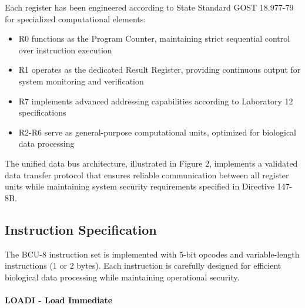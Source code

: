 \documentclass[12pt]{article}
\begin{document}
Each register has been engineered according to State Standard GOST 18.977-79 for specialized computational elements:
\begin{itemize}
    \item R0 functions as the Program Counter, maintaining strict sequential control over instruction execution
    \item R1 operates as the dedicated Result Register, providing continuous output for system monitoring and verification
    \item R7 implements advanced addressing capabilities according to Laboratory 12 specifications
    \item R2-R6 serve as general-purpose computational units, optimized for biological data processing
\end{itemize}

The unified data bus architecture, illustrated in Figure 2, implements a validated data transfer protocol that ensures reliable communication between all register units while maintaining system security requirements specified in Directive 147-8B.

\subsection{Instruction Specification}
The BCU-8 instruction set is implemented with 5-bit opcodes and variable-length instructions (1 or 2 bytes). Each instruction is carefully designed for efficient biological data processing while maintaining operational security.

\paragraph{LOADI - Load Immediate}
\begin{center}
\end{center}
\end{document}

